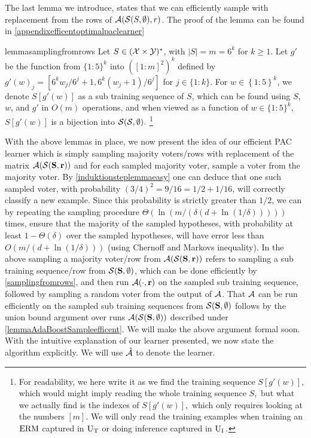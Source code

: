 The last lemma we introduce, states that we can efficiently sample with replacement from the rows of $\mathcal{A}(\mathcal{S}(S,\emptyset),r)$. The proof of the lemma can be found in \cref{appendixefficentoptimalpaclearner}
\begin{restatable}{lemma}{samplingfromrows}\label{samplingfromrows}
  Let $S\in (\mathcal{X}\times \mathcal{Y})^{*}$, with $|S|=m=6^{k}$ for $k\geq 1$.  Let $g'$ be the function from  $\{1:5\}^{k}$ into $\left([1:m]^{2}\right)^{k}$ defined by $g'(w)_{j}=[ 6^{k}w_j/6^{j}+1,6^{k}(w_j+1)/6^{j}]$ for $j\in \{1:k\}$. For $w\in\left\{ 1:5 \right\}^{k}$, we denote $ S[g'(w)] $ as a sub training sequence of $ S $, which can be found using $S$, $ w $, and $g'$ in $O(m)$ operations, and when viewed as a function of $ w\in\{ 1:5 \}^{k} $, $ S[g'(w)] $ is a bijection into $ \mathcal{S}(\mathcal{S},\emptyset).$ \footnote{For readability, we here write it as we find the training sequence $ S[g'(w)],$ which would might imply reading the whole training sequence $ S,$ but what we actually find is the indexes of $ S[g'(w)],$ which only requires looking at the numbers $ [m].$ We will only read the training examples when training an $ \mathrm{ERM} $ captured in $ \operatorname{U_{T}} $ or doing inference captured in $ \operatorname{U_{I}}. $     }
\end{restatable}
With the above lemmas in place, we now present the idea of our efficient PAC learner which is simply sampling majority voters/rows with replacement of the matrix $\mathcal{A}(\mathcal{S}(\mathbf{S},\mathbf{r}))$ and for each sampled majority voter, sample a voter from the majority voter. By \cref{induktionsteplemmaeasy} one can deduce that one such sampled voter, with probability $(3/4)^{2}=9/16=1/2+1/16$, will correctly classify a new example. Since this probability is strictly greater than $1/2$, we can by repeating the sampling procedure $\Theta(\ln{\left(m/(\delta(d+\ln{\left(1/\delta \right)}) )\right)})$ times, ensure that the majority of the sampled hypotheses, with probability at least $1-\Theta(\delta)$ over the sampled hypotheses, will have error less than $O(m/\left(d+\ln{\left(1/\delta \right)}\right))$ (using Chernoff and Markovs inequality). In the above sampling a majority voter/row from $\mathcal{A}(\mathcal{S}(\mathbf{S},\mathbf{r}))$ refers to sampling a sub training sequence/row from $\mathcal{S}(\mathbf{S},\emptyset)$, which can be done efficiently by \cref{samplingfromrows}, and then run $\mathcal{A}(\cdot,\mathbf{r})$ on the sampled sub training sequence, followed by sampling a random voter from the output of $ \mathcal{A} $. That $ \mathcal{A} $ can be run efficiently on the sampled sub training sequences from $ \mathcal{S}(\mathbf{S},\emptyset) $ follows by the union bound argument over runs $ \mathcal{A}(\mathcal{S}(\mathbf{S},\emptyset)) $ described under \cref{lemmaAdaBoostSampleefficent}. We will make the above argument formal soon. With the intuitive explanation of our learner presented, we now state the algorithm explicitly. We will use $ \mathcal{\hat{A}} $ to denote the learner.


